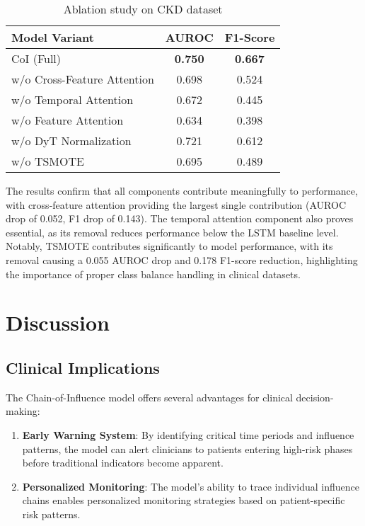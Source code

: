 \documentclass[letterpaper]{article}
\begin{document}
\begin{enumerate}
\begin{table}[htbp]
\centering
\caption{Ablation study on CKD dataset}
\label{tab:ablation}
\begin{tabular}{@{}lcc@{}}
\toprule
Model Variant & AUROC & F1-Score \\
\midrule
CoI (Full) & \textbf{0.750} & \textbf{0.667} \\
w/o Cross-Feature Attention & 0.698 & 0.524 \\
w/o Temporal Attention & 0.672 & 0.445 \\
w/o Feature Attention & 0.634 & 0.398 \\
w/o DyT Normalization & 0.721 & 0.612 \\
w/o TSMOTE & 0.695 & 0.489 \\
\bottomrule
\end{tabular}
\end{table}

The results confirm that all components contribute meaningfully to performance, with cross-feature attention providing the largest single contribution (AUROC drop of 0.052, F1 drop of 0.143). The temporal attention component also proves essential, as its removal reduces performance below the LSTM baseline level. Notably, TSMOTE contributes significantly to model performance, with its removal causing a 0.055 AUROC drop and 0.178 F1-score reduction, highlighting the importance of proper class balance handling in clinical datasets.

\section{Discussion}

\subsection{Clinical Implications}

The Chain-of-Influence model offers several advantages for clinical decision-making:

\begin{enumerate}
    \item \textbf{Early Warning System}: By identifying critical time periods and influence patterns, the model can alert clinicians to patients entering high-risk phases before traditional indicators become apparent.
    
    \item \textbf{Personalized Monitoring}: The model's ability to trace individual influence chains enables personalized monitoring strategies based on patient-specific risk patterns.
    

\end{enumerate}
\end{enumerate}
\end{document}
